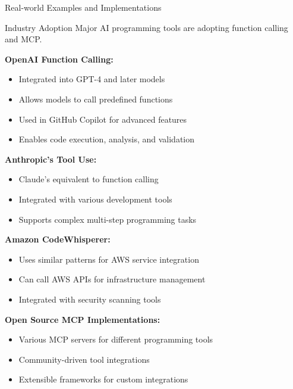 \documentclass{beamer}
\begin{document}
\begin{frame}[t]{Real-world Examples and Implementations}
    \begin{block}{Industry Adoption}
        Major AI programming tools are adopting function calling and MCP.
    \end{block}
    
    \textbf{OpenAI Function Calling:}
    \begin{itemize}
        \item Integrated into GPT-4 and later models
        \item Allows models to call predefined functions
        \item Used in GitHub Copilot for advanced features
        \item Enables code execution, analysis, and validation
    \end{itemize}
    
    \textbf{Anthropic's Tool Use:}
    \begin{itemize}
        \item Claude's equivalent to function calling
        \item Integrated with various development tools
        \item Supports complex multi-step programming tasks
    \end{itemize}
    
    \textbf{Amazon CodeWhisperer:}
    \begin{itemize}
        \item Uses similar patterns for AWS service integration
        \item Can call AWS APIs for infrastructure management
        \item Integrated with security scanning tools
    \end{itemize}
    
    \textbf{Open Source MCP Implementations:}
    \begin{itemize}
        \item Various MCP servers for different programming tools
        \item Community-driven tool integrations
        \item Extensible frameworks for custom integrations
    \end{itemize}
\end{frame}
\end{document}

